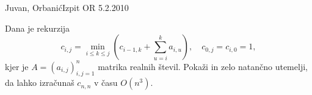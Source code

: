 \begin{naloga}{Juvan, Orbanić}{Izpit OR 5.2.2010}
\begin{vprasanje}
Dana je rekurzija
$$
c_{i,j} = \min_{i \le k \le j} \left(c_{i-1,k} + \sum_{u=i}^k a_{i,u}\right),
\quad c_{0,j} = c_{i,0} = 1 ,
$$
kjer je $A = (a_{i,j})_{i,j=1}^n$ matrika realnih števil.
Pokaži in zelo natančno utemelji,
da lahko izračunaš $c_{n,n}$ v času $O(n^3)$.
\end{vprasanje}
\begin{odgovor}
\end{odgovor}
\end{naloga}
